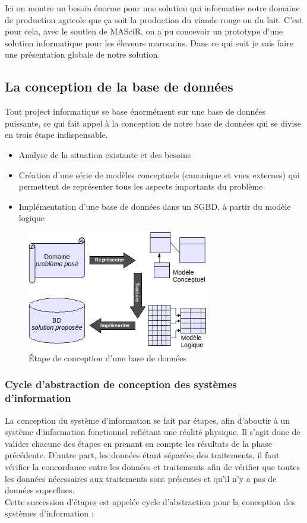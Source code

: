 \documentclass[11pt, a4paper, twoside]{book}
\begin{document}
Ici on montre un besoin énorme pour une solution qui informatise notre domaine de production agricole que ça soit la production du viande rouge ou du lait. C'est pour cela, avec le soutien de MASciR, on a pu concevoir un prototype d'une solution informatique pour les éleveurs marocains. Dans ce qui suit je vais faire une présentation globale de notre solution.

\subsection{La conception de la base de données}
Tout project informatique se base énormément sur une base de données puissante, ce qui fait appel à la conception de notre base de données qui se divise en trois étape indispensable.
\begin{itemize}
\item Analyse de la situation existante et des besoins
\item Création d'une série de modèles conceptuels (canonique et vues externes) qui permettent de représenter tous les aspects importants du problème
\item Implémentation d'une base de données dans un SGBD, à partir du modèle logique

\end{itemize}

\begin{figure}[H]
\centering
\includegraphics[width=8cm]{db}
\caption{Étape de conception d'une base de données}
\end{figure}

\subsubsection{Cycle d'abstraction de conception des systèmes d'information}
La conception du système d'information se fait par étapes, afin d'aboutir à un système d'information fonctionnel reflétant une réalité physique. Il s'agit donc de valider chacune des étapes en prenant en compte les résultats de la phase précédente. D'autre part, les données étant séparées des traitements, il faut vérifier la concordance entre les données et traitements afin de vérifier que toutes les données nécessaires aux traitements sont présentes et qu'il n'y a pas de données superflues.\\
Cette succession d'étapes est appelée cycle d'abstraction pour la conception des systèmes d'information :
\end{document}
